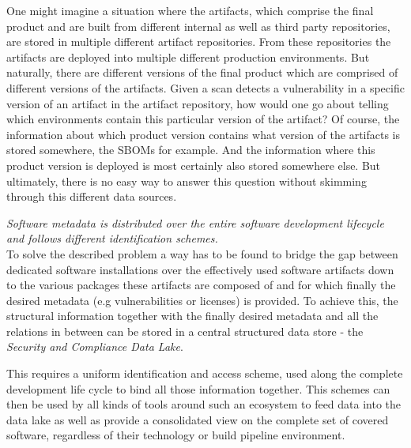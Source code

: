 One might imagine a situation where the artifacts, which comprise the final product and are built from different internal as well as third party repositories, are stored in multiple different artifact repositories. From these repositories the artifacts are deployed into multiple different production environments. But naturally, there are different versions of the final product which are comprised of different versions of the artifacts. Given a scan detects a vulnerability in a specific version of an artifact in the artifact repository, how would one go about telling which environments contain this particular version of the artifact? Of course, the information about which product version contains what version of the artifacts is stored somewhere, the SBOMs for example. And the information where this product version is deployed is most certainly also stored somewhere else. But ultimately, there is no easy way to answer this question without skimming through this different data sources.\par
\emph{Software metadata is distributed over the entire software development lifecycle and follows different identification schemes.}\\

To solve the described problem a way has to be found to bridge the gap between dedicated software installations over the effectively used software artifacts down to the various packages these artifacts are composed of and for which finally the desired metadata (e.g vulnerabilities or licenses) is provided. To achieve this, the structural information together with the finally desired metadata and all the relations in between can be stored in a central structured data store - the \emph{Security and Compliance Data Lake}.\par
This requires a uniform identification and access scheme, used along the complete development life cycle to bind all those information together. This schemes can then be used by all kinds of tools around such an ecosystem to feed data into the data lake as well as provide a consolidated view on the complete set of covered software, regardless of their technology or build pipeline environment.

